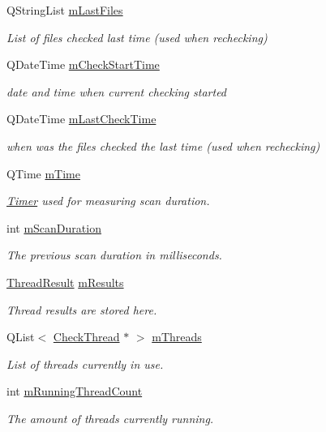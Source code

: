 \begin{DoxyCompactItemize}
\item 
Q\-String\-List \hyperlink{class_thread_handler_a54dffd1608f635d8d02066d7960e0fbe}{m\-Last\-Files}
\begin{DoxyCompactList}\small\item\em List of files checked last time (used when rechecking) \end{DoxyCompactList}\item 
Q\-Date\-Time \hyperlink{class_thread_handler_a7a45b4a20d7951ce48f53df68cca5e39}{m\-Check\-Start\-Time}
\begin{DoxyCompactList}\small\item\em date and time when current checking started \end{DoxyCompactList}\item 
Q\-Date\-Time \hyperlink{class_thread_handler_a8e77afe57fcae1e5158a8c84dbe930c4}{m\-Last\-Check\-Time}
\begin{DoxyCompactList}\small\item\em when was the files checked the last time (used when rechecking) \end{DoxyCompactList}\item 
Q\-Time \hyperlink{class_thread_handler_a85fdecdb5c52732ef77a9b03a7201643}{m\-Time}
\begin{DoxyCompactList}\small\item\em \hyperlink{class_timer}{Timer} used for measuring scan duration. \end{DoxyCompactList}\item 
int \hyperlink{class_thread_handler_a4a815d770eadf0ba47669af57fb8d8b0}{m\-Scan\-Duration}
\begin{DoxyCompactList}\small\item\em The previous scan duration in milliseconds. \end{DoxyCompactList}\item 
\hyperlink{class_thread_result}{Thread\-Result} \hyperlink{class_thread_handler_a7becea262a4b51e1eca239917b644f2b}{m\-Results}
\begin{DoxyCompactList}\small\item\em Thread results are stored here. \end{DoxyCompactList}\item 
Q\-List$<$ \hyperlink{class_check_thread}{Check\-Thread} $\ast$ $>$ \hyperlink{class_thread_handler_af4d3e7352cb349e673b334a565964e2a}{m\-Threads}
\begin{DoxyCompactList}\small\item\em List of threads currently in use. \end{DoxyCompactList}\item 
int \hyperlink{class_thread_handler_ab624bd264640ef116ea802e9c41fbcc2}{m\-Running\-Thread\-Count}
\begin{DoxyCompactList}\small\item\em The amount of threads currently running. \end{DoxyCompactList}\end{DoxyCompactItemize}


